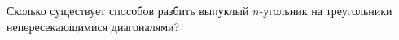 Сколько существует способов разбить выпуклый $n$-угольник на треугольники непересекающимися диагоналями?

